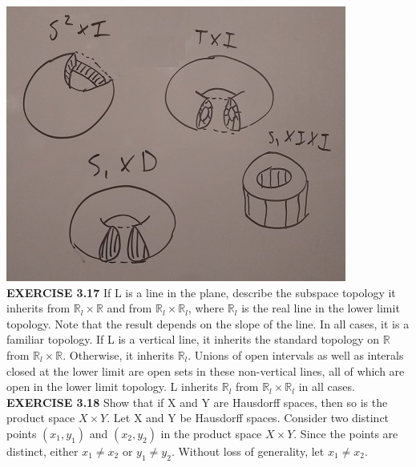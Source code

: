 \documentclass[12pt]{article}
\begin{document}
  \includegraphics{IMG316}
  \newline
  \newpage
  \noindent
  \textbf{EXERCISE 3.17} If L is a line in the plane, describe the subspace topology it inherits from \(\mathbb{R}_l \times \mathbb{R}\) and from \(\mathbb{R}_l \times \mathbb{R}_l\), where \(\mathbb{R}_l\) is the real line in the lower limit topology. Note that the result depends on the slope of the line. In all cases, it is a familiar topology.
  \newline \newline
  If L is a vertical line, it inherits the standard topology on \(\mathbb{R}\) from \(\mathbb{R}_l \times \mathbb{R}\). Otherwise, it inherits  \(\mathbb{R}_l\). Unions of open intervals as well as interals closed at the lower limit are open sets in these non-vertical lines, all of which are open in the lower limit topology.
  \newline \newline
  L inherits \(\mathbb{R}_l\) from \(\mathbb{R}_l \times \mathbb{R}_l\) in all cases.
  \newpage
  \noindent
  \textbf{EXERCISE 3.18}
  Show that if X and Y are Hausdorff spaces, then so is the product space \(X \times Y\).
  \newline \newline
  Let X and Y be Hausdorff spaces.
  \newline
  Consider two distinct points \((x_1,y_1)\) and \((x_2,y_2)\) in the product space \(X \times Y\).
  \newline
  Since the points are distinct, either \(x_1 \neq x_2\) or \(y_1 \neq y_2\). \newline
  Without loss of generality, let \(x_1 \neq x_2\).
  \newline \newline
\end{document}
